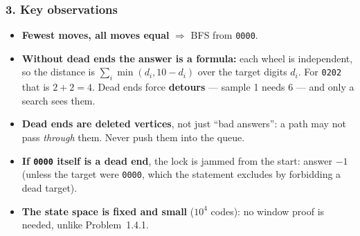 \begin{diagrambox}
\end{diagrambox}

\subsubsection*{3. Key observations}

\begin{itemize}[leftmargin=*]
    \item \textbf{Fewest moves, all moves equal} $\Rightarrow$ BFS from \texttt{0000}.
    \item \textbf{Without dead ends the answer is a formula:} each wheel is independent, so the distance is $\sum_{i} \min(d_i, 10 - d_i)$ over the target digits $d_i$. For \texttt{0202} that is $2 + 2 = 4$. Dead ends force \textbf{detours} --- sample 1 needs 6 --- and only a search sees them.
    \item \textbf{Dead ends are deleted vertices}, not just ``bad answers'': a path may not pass \emph{through} them. Never push them into the queue.
    \item \textbf{If \texttt{0000} itself is a dead end}, the lock is jammed from the start: answer $-1$ (unless the target were \texttt{0000}, which the statement excludes by forbidding a dead target).
    \item \textbf{The state space is fixed and small} ($10^4$ codes): no window proof is needed, unlike Problem~1.4.1.
\end{itemize}

